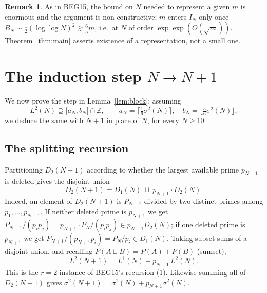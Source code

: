 \documentclass[11pt]{amsart}
\theoremstyle{plain}
\theoremstyle{definition}
\newtheorem{remark}[theorem]{Remark}
\newcommand{\Z}{\mathbb{Z}}
\begin{document}
\begin{remark}
As in BEG15, the bound on $N$ needed to represent a given $m$ is enormous and the
argument is non-constructive: $m$ enters $I_N$ only once
$B_N\sim\frac12(\log\log N)^2\gtrsim\frac65 m$, i.e.\ at $N$ of order
$\exp\exp(O(\sqrt m))$.  Theorem~\ref{thm:main} asserts existence of a
representation, not a small one.
\end{remark}

\section{The induction step \texorpdfstring{$N\to N+1$}{N to N+1}}
\label{sec:step}

We now prove the step in Lemma~\ref{lem:block}: assuming
\[
L^2(N)\supseteq\bigl[a_N,b_N\bigr]\cap\Z,\qquad
a_N=\bigl\lceil\tfrac16\sigma^2(N)\bigr\rceil,\quad
b_N=\bigl\lfloor\tfrac56\sigma^2(N)\bigr\rfloor,
\]
we deduce the same with $N+1$ in place of $N$, for every $N\ge 10$.

\subsection{The splitting recursion}
Partitioning $D_2(N+1)$ according to whether the largest available prime
$p_{N+1}$ is deleted gives the disjoint union
\[
D_2(N+1)=D_1(N)\ \sqcup\ p_{N+1}\cdot D_2(N).
\tag{R}
\]
Indeed, an element of $D_2(N+1)$ is $P_{N+1}$ divided by two distinct primes
among $p_1,\dots,p_{N+1}$.  If neither deleted prime is $p_{N+1}$ we get
$P_{N+1}/(p_ip_j)=p_{N+1}\cdot P_N/(p_ip_j)\in p_{N+1}D_2(N)$; if one deleted
prime is $p_{N+1}$ we get $P_{N+1}/(p_{N+1}p_i)=P_N/p_i\in D_1(N)$.  Taking subset
sums of a disjoint union, and recalling $P(A\sqcup B)=P(A)+P(B)$ (sumset),
\begin{equation}
L^2(N+1)=L^1(N)+p_{N+1}\,L^2(N).
\tag{S}\label{eq:rec}\end{equation}
This is the $r=2$ instance of BEG15's recursion (1).  Likewise summing all of
$D_2(N+1)$ gives $\sigma^2(N+1)=\sigma^1(N)+p_{N+1}\sigma^2(N)$.
\end{document}
